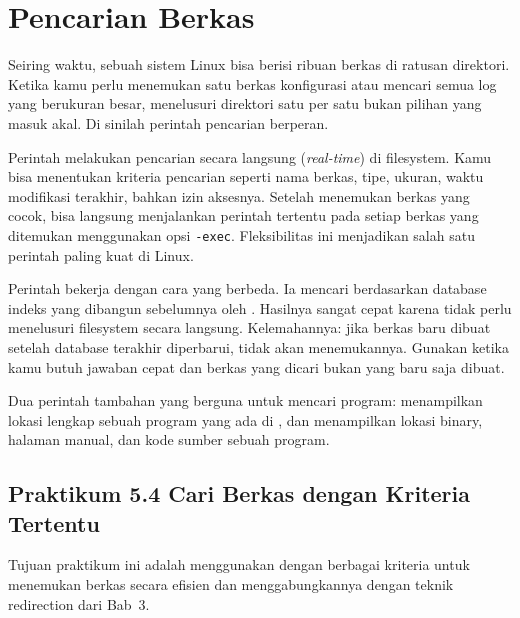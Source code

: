 \section{Pencarian Berkas}
\label{sec:search}

Seiring waktu, sebuah sistem Linux bisa berisi ribuan berkas di ratusan direktori. Ketika
kamu perlu menemukan satu berkas konfigurasi atau mencari semua log yang berukuran besar,
menelusuri direktori satu per satu bukan pilihan yang masuk akal. Di sinilah perintah
pencarian berperan.

Perintah  melakukan pencarian secara langsung (\textit{real-time}) di filesystem.
Kamu bisa menentukan kriteria pencarian seperti nama berkas, tipe, ukuran, waktu modifikasi
terakhir, bahkan izin aksesnya. Setelah menemukan berkas yang cocok,  bisa
langsung menjalankan perintah tertentu pada setiap berkas yang ditemukan menggunakan opsi
\texttt{-exec}. Fleksibilitas ini menjadikan  salah satu perintah paling kuat
di Linux.

Perintah  bekerja dengan cara yang berbeda. Ia mencari berdasarkan database
indeks yang dibangun sebelumnya oleh . Hasilnya sangat cepat karena tidak
perlu menelusuri filesystem secara langsung. Kelemahannya: jika berkas baru dibuat setelah
database terakhir diperbarui,  tidak akan menemukannya. Gunakan 
ketika kamu butuh jawaban cepat dan berkas yang dicari bukan yang baru saja dibuat.

Dua perintah tambahan yang berguna untuk mencari program:  menampilkan lokasi
lengkap sebuah program yang ada di , dan  menampilkan lokasi binary,
halaman manual, dan kode sumber sebuah program.

\subsection*{Praktikum 5.4 Cari Berkas dengan Kriteria Tertentu}

Tujuan praktikum ini adalah menggunakan  dengan berbagai kriteria untuk menemukan
berkas secara efisien dan menggabungkannya dengan teknik redirection dari Bab~3.

